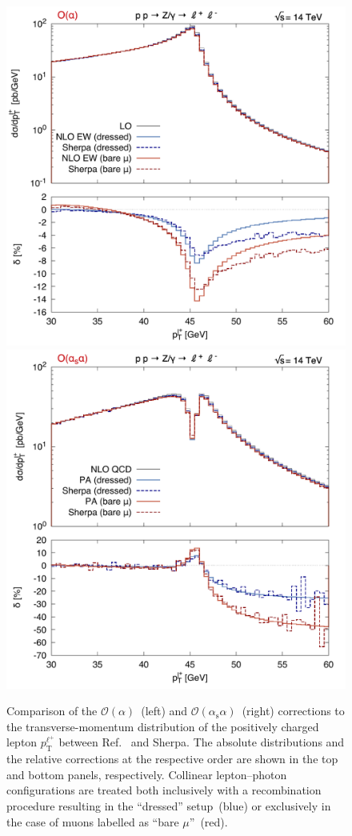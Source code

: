 \documentclass[11pt]{cernrep}
\newcommand{\order}{\ensuremath{\mathcal{O}}}
\newcommand{\alphas}{\ensuremath{\alpha_\mathrm{s}}}
\newcommand{\rT}{\ensuremath{\mathrm{T}}} %
\DeclareRobustCommand{\Plp}{{\ensuremath{\ell^+}}}
\begin{document}
\begin{figure}
  \includegraphics[width=.48\linewidth]{images/Z_ptl+2_LO.pdf} \hfill
  \includegraphics[width=.48\linewidth]{images/Z_ptl+2_NLO.pdf} 
  \caption{
    Comparison of the $\order(\alpha)$~(left) and $\order(\alphas\alpha)$~(right) corrections to the transverse-momentum distribution of the positively charged lepton $p_\rT^\Plp$ between Ref.~\cite{Dittmaier:2015rxo} and Sherpa.
    The absolute distributions and the relative corrections at the respective order are shown in the top and bottom panels, respectively.
    Collinear lepton--photon configurations are treated both inclusively with a recombination procedure resulting in the ``dressed'' setup~(blue) or exclusively in the case of muons labelled as ``bare $\mu$''~(red).
  }
  \label{fig:ptl}
\end{figure}
\end{document}
